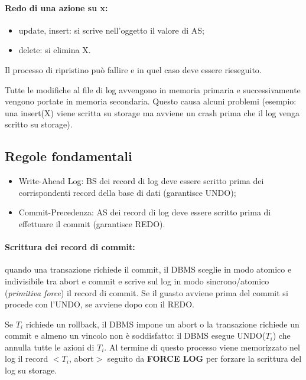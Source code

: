 \paragraph{Redo di una azione su x:}

\begin{itemize}
    \item update, insert: si scrive nell'oggetto il valore di AS;
    \item delete: si elimina X.
\end{itemize}

Il processo di ripristino può fallire e in quel caso deve essere rieseguito.

Tutte le modifiche al file di log avvengono in memoria primaria e successivamente vengono portate in memoria secondaria. Questo causa alcuni problemi (esempio: una insert(X) viene scritta su storage ma avviene un crash prima che il log venga scritto su storage).

\subsection{Regole fondamentali}

\begin{itemize}
    \item Write-Ahead Log: BS dei record di log deve essere scritto prima dei corrispondenti record della base di dati (garantisce UNDO);
    \item Commit-Precedenza: AS dei record di log deve essere scritto prima di effettuare il commit (garantisce REDO).
\end{itemize}

\paragraph{Scrittura dei record di commit:} quando una transazione richiede il commit, il DBMS sceglie in modo atomico e indivisibile tra abort e commit e scrive sul log in modo sincrono/atomico (\textit{primitiva force}) il record di commit. Se il guasto avviene prima del commit si procede con l'UNDO, se avviene dopo con il REDO.

Se $T_i$ richiede un rollback, il DBMS impone un abort o la transazione richiede un commit e almeno un vincolo non è soddisfatto: il DBMS esegue UNDO($T_i$) che annulla tutte le azioni di $T_i$. Al termine di questo processo viene memorizzato nel log il record $<T_i$, abort$>$ seguito da \textbf{FORCE LOG} per forzare la scrittura del log su storage.

